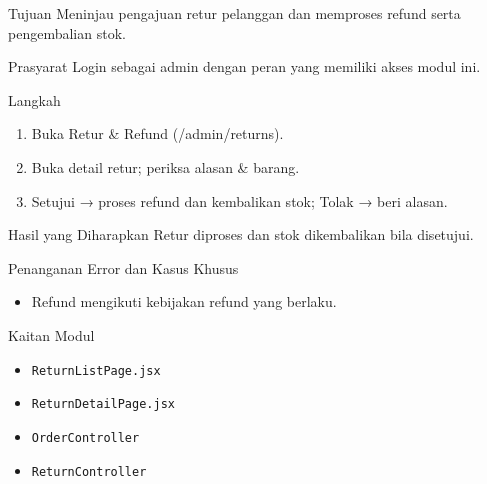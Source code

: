 
\begin{flowsection}{Tujuan}
Meninjau pengajuan retur pelanggan dan memproses refund serta pengembalian stok.
\end{flowsection}

\begin{flowsection}{Prasyarat}
Login sebagai admin dengan peran yang memiliki akses modul ini.
\end{flowsection}

\begin{flowsection}{Langkah}
\begin{enumerate}
  \item Buka Retur \&  Refund (/admin/returns).
  \item Buka detail retur; periksa alasan \&  barang.
  \item Setujui → proses refund dan kembalikan stok; Tolak → beri alasan.
\end{enumerate}
\end{flowsection}


\begin{flowsection}{Hasil yang Diharapkan}
Retur diproses dan stok dikembalikan bila disetujui.
\end{flowsection}

\begin{flowsection}{Penanganan Error dan Kasus Khusus}
\begin{itemize}
  \item Refund mengikuti kebijakan refund yang berlaku.
\end{itemize}
\end{flowsection}

\begin{flowsection}{Kaitan Modul}
\begin{itemize}
  \item \texttt{ReturnListPage.jsx}
  \item \texttt{ReturnDetailPage.jsx}
  \item \texttt{OrderController}
  \item \texttt{ReturnController}
\end{itemize}
\end{flowsection}

